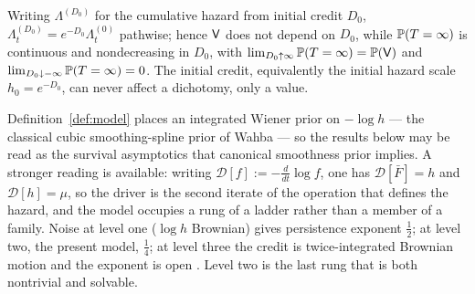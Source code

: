 \begin{lemma}\label{lem:gauge}
Writing $\Lambda^{(D_0)}$ for the cumulative hazard from initial
credit $D_0$, $\Lambda^{(D_0)}_t=e^{-D_0}\Lambda^{(0)}_t$ pathwise;
hence $\mathsf{V}$ does not depend on $D_0$, while $\mathbb{P}(T=\infty)$ is
continuous and nondecreasing in $D_0$, with
$\lim_{D_0\uparrow\infty}\mathbb{P}(T=\infty)=\mathbb{P}(\mathsf{V})$ and
$\lim_{D_0\downarrow-\infty}\mathbb{P}(T=\infty)=0$. The initial credit,
equivalently the initial hazard scale $h_0=e^{-D_0}$, can never affect
a dichotomy, only a value.
\end{lemma}

\begin{remark}
Definition~\ref{def:model} places an integrated Wiener prior on
$-\log h$ --- the classical cubic smoothing-spline prior of Wahba
\cite{Wah78} --- so the results below may be read as the survival
asymptotics that canonical smoothness prior implies. A stronger
reading is available: writing $\mathcal D[f]:=-\frac{d}{dt}\log f$,
one has $\mathcal D[\bar F]=h$ and $\mathcal D[h]=\mu$, so the driver
is the second iterate of the operation that defines the hazard, and
the model occupies a rung of a ladder rather than a member of a
family. Noise at level one ($\log h$ Brownian) gives persistence
exponent $\tfrac12$; at level two, the present model, $\tfrac14$; at
level three the credit is twice-integrated Brownian motion and the
exponent is open \cite{AS15,AD13}. Level two is the last rung that is
both nontrivial and solvable.
\end{remark}

